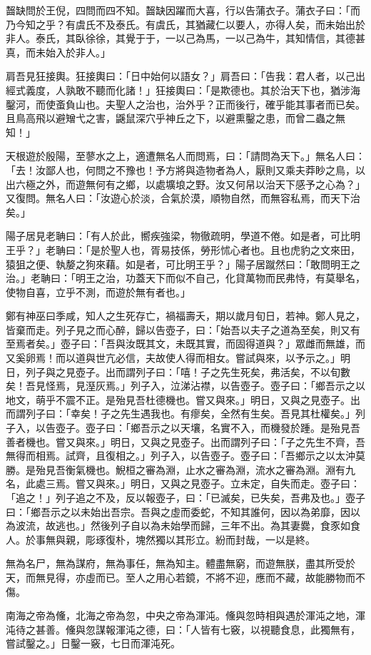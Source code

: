 
\begin{pinyinscope}
齧缺問於王倪，四問而四不知。齧缺因躍而大喜，行以告蒲衣子。蒲衣子曰：「而乃今知之乎？有虞氏不及泰氏。有虞氏，其猶藏仁以要人，亦得人矣，而未始出於非人。泰氏，其臥徐徐，其覺于于，一以己為馬，一以己為牛，其知情信，其德甚真，而未始入於非人。」

肩吾見狂接輿。狂接輿曰：「日中始何以語女？」肩吾曰：「告我：君人者，以己出經式義度，人孰敢不聽而化諸！」狂接輿曰：「是欺德也。其於治天下也，猶涉海鑿河，而使蚉負山也。夫聖人之治也，治外乎？正而後行，確乎能其事者而已矣。且鳥高飛以避矰弋之害，鼷鼠深穴乎神丘之下，以避熏鑿之患，而曾二蟲之無知！」

天根遊於殷陽，至蓼水之上，適遭無名人而問焉，曰：「請問為天下。」無名人曰：「去！汝鄙人也，何問之不豫也！予方將與造物者為人，厭則又乘夫莽眇之鳥，以出六極之外，而遊無何有之鄉，以處壙埌之野。汝又何帠以治天下感予之心為？」又復問。無名人曰：「汝遊心於淡，合氣於漠，順物自然，而無容私焉，而天下治矣。」

陽子居見老聃曰：「有人於此，嚮疾強梁，物徹疏明，學道不倦。如是者，可比明王乎？」老聃曰：「是於聖人也，胥易技係，勞形怵心者也。且也虎豹之文來田，猿狙之便、執嫠之狗來藉。如是者，可比明王乎？」陽子居蹴然曰：「敢問明王之治。」老聃曰：「明王之治，功蓋天下而似不自己，化貸萬物而民弗恃，有莫舉名，使物自喜，立乎不測，而遊於無有者也。」

鄭有神巫曰季咸，知人之生死存亡，禍福壽夭，期以歲月旬日，若神。鄭人見之，皆棄而走。列子見之而心醉，歸以告壺子，曰：「始吾以夫子之道為至矣，則又有至焉者矣。」壺子曰：「吾與汝既其文，未既其實，而固得道與？」眾雌而無雄，而又奚卵焉！而以道與世亢必信，夫故使人得而相女。嘗試與來，以予示之。」明日，列子與之見壺子。出而謂列子曰：「嘻！子之先生死矣，弗活矣，不以旬數矣！吾見怪焉，見溼灰焉。」列子入，泣涕沾襟，以告壺子。壺子曰：「鄉吾示之以地文，萌乎不震不正。是殆見吾杜德機也。嘗又與來。」明日，又與之見壺子。出而謂列子曰：「幸矣！子之先生遇我也。有瘳矣，全然有生矣。吾見其杜權矣。」列子入，以告壺子。壺子曰：「鄉吾示之以天壤，名實不入，而機發於踵。是殆見吾善者機也。嘗又與來。」明日，又與之見壺子。出而謂列子曰：「子之先生不齊，吾無得而相焉。試齊，且復相之。」列子入，以告壺子。壺子曰：「吾鄉示之以太沖莫勝。是殆見吾衡氣機也。鯢桓之審為淵，止水之審為淵，流水之審為淵。淵有九名，此處三焉。嘗又與來。」明日，又與之見壺子。立未定，自失而走。壺子曰：「追之！」列子追之不及，反以報壺子，曰：「已滅矣，已失矣，吾弗及也。」壺子曰：「鄉吾示之以未始出吾宗。吾與之虛而委蛇，不知其誰何，因以為弟靡，因以為波流，故逃也。」然後列子自以為未始學而歸，三年不出。為其妻爨，食豕如食人。於事無與親，彫琢復朴，塊然獨以其形立。紛而封哉，一以是終。

無為名尸，無為謀府，無為事任，無為知主。體盡無窮，而遊無朕，盡其所受於天，而無見得，亦虛而已。至人之用心若鏡，不將不迎，應而不藏，故能勝物而不傷。

南海之帝為儵，北海之帝為忽，中央之帝為渾沌。儵與忽時相與遇於渾沌之地，渾沌待之甚善。儵與忽謀報渾沌之德，曰：「人皆有七竅，以視聽食息，此獨無有，嘗試鑿之。」日鑿一竅，七日而渾沌死。


\end{pinyinscope}